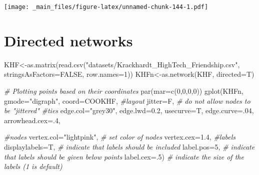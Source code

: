 \documentclass[
  notitlepage,
  onecolumn,
  openany]{book}
\newenvironment{Shaded}{\begin{snugshade}}{\end{snugshade}}
\newcommand{\AttributeTok}[1]{\textcolor[rgb]{0.77,0.63,0.00}{#1}}
\newcommand{\CommentTok}[1]{\textcolor[rgb]{0.56,0.35,0.01}{\textit{#1}}}
\newcommand{\ConstantTok}[1]{\textcolor[rgb]{0.00,0.00,0.00}{#1}}
\newcommand{\DecValTok}[1]{\textcolor[rgb]{0.00,0.00,0.81}{#1}}
\newcommand{\FloatTok}[1]{\textcolor[rgb]{0.00,0.00,0.81}{#1}}
\newcommand{\FunctionTok}[1]{\textcolor[rgb]{0.00,0.00,0.00}{#1}}
\newcommand{\NormalTok}[1]{#1}
\newcommand{\OtherTok}[1]{\textcolor[rgb]{0.56,0.35,0.01}{#1}}
\newcommand{\StringTok}[1]{\textcolor[rgb]{0.31,0.60,0.02}{#1}}
\begin{document}
\texttt{[image: \_main\_files/figure-latex/unnamed-chunk-144-1.pdf]}

\hypertarget{directed-networks}{%
\section{Directed networks}\label{directed-networks}}

\begin{Shaded}
\begin{Highlighting}[]
\NormalTok{KHF}\OtherTok{\textless{}{-}}\FunctionTok{as.matrix}\NormalTok{(}\FunctionTok{read.csv}\NormalTok{(}\StringTok{"datasets/Krackhardt\_HighTech\_Friendship.csv"}\NormalTok{,}
                        \AttributeTok{stringsAsFactors=}\ConstantTok{FALSE}\NormalTok{, }\AttributeTok{row.names=}\DecValTok{1}\NormalTok{))}
\NormalTok{KHFn}\OtherTok{\textless{}{-}}\FunctionTok{as.network}\NormalTok{(KHF, }\AttributeTok{directed=}\NormalTok{T)}
\end{Highlighting}
\end{Shaded}

\begin{Shaded}
\begin{Highlighting}[]
\CommentTok{\# Plotting points based on their coordinates}
\FunctionTok{par}\NormalTok{(}\AttributeTok{mar=}\FunctionTok{c}\NormalTok{(}\DecValTok{0}\NormalTok{,}\DecValTok{0}\NormalTok{,}\DecValTok{0}\NormalTok{,}\DecValTok{0}\NormalTok{))}
\FunctionTok{gplot}\NormalTok{(KHFn,}
      \AttributeTok{gmode=}\StringTok{"digraph"}\NormalTok{,  }
      \AttributeTok{coord=}\NormalTok{COOKHF,}
      \CommentTok{\#layout}
      \AttributeTok{jitter=}\NormalTok{F,           }\CommentTok{\# do not allow nodes to be "jittered"}
      \CommentTok{\#ties}
      \AttributeTok{edge.col=}\StringTok{"grey30"}\NormalTok{,}
      \AttributeTok{edge.lwd=}\FloatTok{0.2}\NormalTok{,}
      \AttributeTok{usecurve=}\NormalTok{T,}
      \AttributeTok{edge.curve=}\NormalTok{.}\DecValTok{04}\NormalTok{, }
      \AttributeTok{arrowhead.cex=}\NormalTok{.}\DecValTok{4}\NormalTok{,}
      
      \CommentTok{\#nodes}
      \AttributeTok{vertex.col=}\StringTok{"lightpink"}\NormalTok{,   }\CommentTok{\# set color of nodes}
      \AttributeTok{vertex.cex=}\FloatTok{1.4}\NormalTok{,}
      \CommentTok{\#labels}
      \AttributeTok{displaylabels=}\NormalTok{T,    }\CommentTok{\# indicate that labels should be included}
      \AttributeTok{label.pos=}\DecValTok{5}\NormalTok{,        }\CommentTok{\# indicate that labels should be given below points}
      \AttributeTok{label.cex=}\NormalTok{.}\DecValTok{5}\NormalTok{)       }\CommentTok{\# indicate the size of the labels (1 is default)}
\end{Highlighting}
\end{Shaded}
\end{document}
